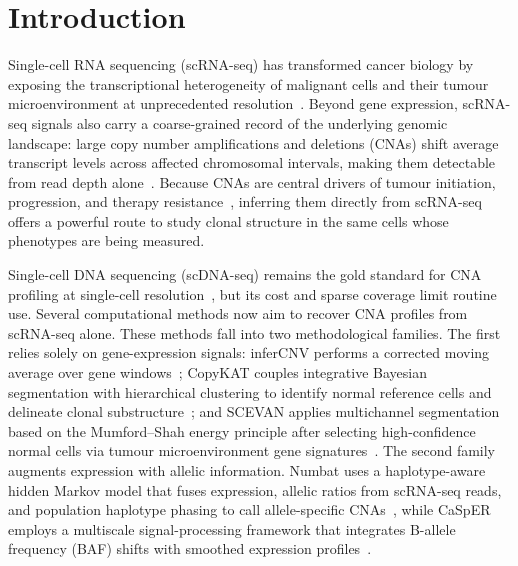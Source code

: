 
\section{Introduction}

Single-cell RNA sequencing (scRNA-seq) has transformed cancer biology by exposing the transcriptional heterogeneity of malignant cells and their tumour microenvironment at unprecedented resolution~\cite{tang2009mrnaseq,patel2014single,tirosh2016dissecting}. Beyond gene expression, scRNA-seq signals also carry a coarse-grained record of the underlying genomic landscape: large copy number amplifications and deletions (CNAs) shift average transcript levels across affected chromosomal intervals, making them detectable from read depth alone~\cite{patel2014single,beroukhim2010landscape}. Because CNAs are central drivers of tumour initiation, progression, and therapy resistance~\cite{beroukhim2010landscape,stephens2011chromothripsis,mcgranahan2017clonal}, inferring them directly from scRNA-seq offers a powerful route to study clonal structure in the same cells whose phenotypes are being measured.

Single-cell DNA sequencing (scDNA-seq) remains the gold standard for CNA profiling at single-cell resolution~\cite{navin2011tumor,gawad2016singlecell}, but its cost and sparse coverage limit routine use. Several computational methods now aim to recover CNA profiles from scRNA-seq alone. These methods fall into two methodological families. The first relies solely on gene-expression signals: inferCNV performs a corrected moving average over gene windows~\cite{tickle2019infercnv}; CopyKAT couples integrative Bayesian segmentation with hierarchical clustering to identify normal reference cells and delineate clonal substructure~\cite{gao2021copykat}; and SCEVAN applies multichannel segmentation based on the Mumford--Shah energy principle after selecting high-confidence normal cells via tumour microenvironment gene signatures~\cite{defalco2023scevan}. The second family augments expression with allelic information. Numbat uses a haplotype-aware hidden Markov model that fuses expression, allelic ratios from scRNA-seq reads, and population haplotype phasing to call allele-specific CNAs~\cite{gao2023numbat}, while CaSpER employs a multiscale signal-processing framework that integrates B-allele frequency (BAF) shifts with smoothed expression profiles~\cite{serin2020casper}.

